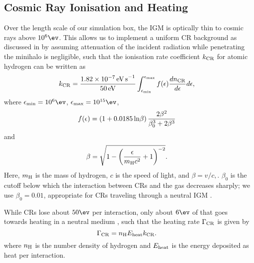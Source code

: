 \subsection{Cosmic Ray Ionisation and Heating}
\label{CRchem}
Over the length scale of our simulation box, the IGM is optically thin to cosmic rays above $10^6\ev$. This allows us to implement a uniform CR background as discussed in  by assuming attenuation of the incident radiation while penetrating the minihalo is negligible, such that the ionisation rate coefficient $k_{\rm \small CR}$ for atomic hydrogen \citep{Schlickeiser2002} can be written as
\begin{equation}
k_{\rm \small CR} = \frac{1.82\times10^{-7}\,{\rm \small eV\,s}^{-1}}{50\,{\rm \small eV}} 
    \int_{\epsilon_{\rm min}}^{\epsilon_{\rm max}} f(\epsilon) \frac{dn_{\rm \tiny CR}}{d\epsilon} d\epsilon,
\end{equation}
where $\epsilon_{\rm min} = 10^6\ev$, $\epsilon_{\rm max}= 10^{15}\ev$,
\begin{equation}    
    f(\epsilon) = (1 + 0.0185 \,{\rm ln}\beta )\, \frac{2 \beta^2}{\beta_0^3 + 2 \beta^3}
\end{equation}
and
\begin{equation}
    \beta =  \sqrt{1 - \left( \frac{\epsilon}{m_{\rm \tiny H}c^2}+1 \right)^{-2}}.
\end{equation}
Here, $m_{\rm \small H}$ is the mass of hydrogen, $c$ is the speed of light, and $\beta = v/c,$. $\beta_0$ is the cutoff below which the interaction between CRs and the gas decreases sharply; we use $\beta_0=0.01$, appropriate for CRs traveling through a neutral IGM \citep{StacyBromm2007}.

While CRs lose about $50\ev$ per interaction, only about $6\ev$ of that goes towards heating in a neutral medium \citep{SpitzerScott1969, ShullvanSteenberg1985}, such that the heating rate $\Gamma_{\rm \small CR}$ is given by
\begin{equation}
\Gamma_{\rm \small CR} = n_{\rm \small H} E_{\rm \small heat} k_{\rm \small CR}.
\end{equation}
where $n_{\rm \small H}$ is the number density of hydrogen and $E_{\rm \small heat}$ is the energy deposited as heat per interaction.